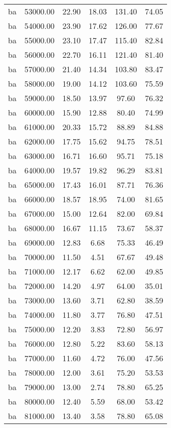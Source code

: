 \begin{table}[ht]
\begin{table}[ht]
\begin{tabular}{|cccccc}
  ba & 53000.00 & 22.90 & 18.03 & 131.40 & 74.05 \\ 
  ba & 54000.00 & 23.90 & 17.62 & 126.00 & 77.67 \\ 
  ba & 55000.00 & 23.10 & 17.47 & 115.40 & 82.84 \\ 
  ba & 56000.00 & 22.70 & 16.11 & 121.40 & 81.40 \\ 
  ba & 57000.00 & 21.40 & 14.34 & 103.80 & 83.47 \\ 
  ba & 58000.00 & 19.00 & 14.12 & 103.60 & 75.59 \\ 
  ba & 59000.00 & 18.50 & 13.97 & 97.60 & 76.32 \\ 
  ba & 60000.00 & 15.90 & 12.88 & 80.40 & 74.99 \\ 
  ba & 61000.00 & 20.33 & 15.72 & 88.89 & 84.88 \\ 
  ba & 62000.00 & 17.75 & 15.62 & 94.75 & 78.51 \\ 
  ba & 63000.00 & 16.71 & 16.60 & 95.71 & 75.18 \\ 
  ba & 64000.00 & 19.57 & 19.82 & 96.29 & 83.81 \\ 
  ba & 65000.00 & 17.43 & 16.01 & 87.71 & 76.36 \\ 
  ba & 66000.00 & 18.57 & 18.95 & 74.00 & 81.65 \\ 
  ba & 67000.00 & 15.00 & 12.64 & 82.00 & 69.84 \\ 
  ba & 68000.00 & 16.67 & 11.15 & 73.67 & 58.37 \\ 
  ba & 69000.00 & 12.83 & 6.68 & 75.33 & 46.49 \\ 
  ba & 70000.00 & 11.50 & 4.51 & 67.67 & 49.48 \\ 
  ba & 71000.00 & 12.17 & 6.62 & 62.00 & 49.85 \\ 
  ba & 72000.00 & 14.20 & 4.97 & 64.00 & 35.01 \\ 
  ba & 73000.00 & 13.60 & 3.71 & 62.80 & 38.59 \\ 
  ba & 74000.00 & 11.80 & 3.77 & 76.80 & 47.51 \\ 
  ba & 75000.00 & 12.20 & 3.83 & 72.80 & 56.97 \\ 
  ba & 76000.00 & 12.80 & 5.22 & 83.60 & 58.13 \\ 
  ba & 77000.00 & 11.60 & 4.72 & 76.00 & 47.56 \\ 
  ba & 78000.00 & 12.00 & 3.61 & 75.20 & 53.53 \\ 
  ba & 79000.00 & 13.00 & 2.74 & 78.80 & 65.25 \\ 
  ba & 80000.00 & 12.40 & 5.59 & 68.00 & 53.42 \\ 
  ba & 81000.00 & 13.40 & 3.58 & 78.80 & 65.08 \\ 

\end{tabular}
\end{table}
\end{table}
